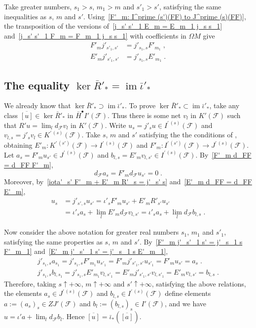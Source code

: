 \documentclass{memo-l}
\theoremstyle{plain}
\theoremstyle{definition}
\theoremstyle{remark}
\newcommand{\FF}{\mathcal{F}}
\newcommand{\im}{\operatorname{im}}
\numberwithin{section}{chapter}
\numberwithin{equation}{section}%
\begin{document}
Take greater numbers, $s_1>s$, $m_1>m$ and $s'_1>s'$, satisfying the same inequalities as $s$, $m$ and $s'$. Using~\eqref{F'_m: I^prime (s')(FF) to J^prime (s)(FF)}, the transposition of the versions of~\eqref{j_s' s'_1 E_m = E_m_1 j_s s_1} and~\eqref{j_s' s'_1 F_m = F_m_1 j_s s_1} with coefficients in $\Omega M$ give
\begin{align}
F'_mj'_{s'_1,s'}&=j'_{s_1,s}F'_{m_1}\;,\label{F'_m j'_s'_1 s' = j'_s_1 s F'_m_1}\\
E'_mj'_{s'_1,s'}&=j'_{s_1,s}E'_{m_1}\;.\label{E'_m j'_s'_1 s' = j'_s_1 s E'_m_1}
\end{align}


\subsection{The equality $\ker\bar R'_*=\im\bar\iota'_*$}\label{ss: ker bar R'_* = im bar iota'_*}

We already know that $\ker\bar R'_*\supset\im\bar\iota'_*$. To prove $\ker\bar R'_*\subset\im\bar\iota'_*$, take any class $\overline{[u]}\in\ker\bar R'_*$ in $\bar H^\bullet I'(\FF)$. Thus there is some net $v_l$ in $K'(\FF)$ such that $R'u=\lim_ld_\FF v_l$ in $K'(\FF)$. Write $u_s=j'_su\in I^{\prime\,(s)}(\FF)$ and $v_{l,s}=j'_sv_l\in K^{\prime\,(s)}(\FF)$. Take $s$, $m$ and $s'$ satisfying the the conditions of , obtaining $E'_m:K^{\prime\,(s')}(\FF)\to I^{\prime\,(s)}(\FF)$ and $F'_m:I^{\prime\,(s')}(\FF)\to J^{\prime\,(s)}(\FF)$. Let $a_s=F'_mu_{s'}\in J^{\prime\,(s)}(\FF)$ and $b_{l,s}=E'_mv_{l,s'}\in I^{\prime\,(s)}(\FF)$. By~\eqref{F'_m d_FF = d_FF F'_m},
\[
d_\FF a_s=F'_md_\FF u_{s'}=0\;.
\]
Moreover, by~\eqref{iota'_s' F'_m + E'_m R'_s = j'_s' s} and~\eqref{E'_m d_FF = d_FF E'_m},
\begin{align*}
u_s&=j'_{s',s}u_{s'}=\iota'_sF'_mu_{s'}+E'_mR'_{s'}u_{s'}\\
&=\iota'_sa_s+\lim_lE'_md_\FF v_{l,s'}
=\iota'_sa_s+\lim_ld_\FF b_{l,s}\;.
\end{align*}

Now consider the above notation for greater real numbers $s_1$, $m_1$ and $s'_1$, satisfying the same properties as $s$, $m$ and $s'$. By~\eqref{F'_m j'_s'_1 s' = j'_s_1 s F'_m_1} and~\eqref{E'_m j'_s'_1 s' = j'_s_1 s E'_m_1},
\begin{gather*}
j'_{s_1,s}a_{s_1}=j'_{s_1,s}F'_{m_1}u_{s'_1}=F'_{m}j'_{s'_1,s'}u_{s'_1}=F'_{m}u_{s'}=a_s\;.\\
j'_{s_1,s}b_{l,s_1}=j'_{s_1,s}E'_{m_1}v_{l,s'_1}=E'_{m}j'_{s'_1,s'}v_{l,s'_1}=E'_{m}v_{l,s'}=b_{l,s}\;.
\end{gather*}
Therefore, taking $s\uparrow+\infty$, $m\uparrow+\infty$ and $s'\uparrow+\infty$, satisfying the above relations, the elements $a_s\in J^{\prime\,(s)}(\FF)$ and $b_{l,s}\in I^{\prime\,(s)}(\FF)$ define elements $a:=(a_s)_s\in ZJ'(\FF)$ and $b_l:=(b_{l,s})_s\in I'(\FF)$, and we have $u=\iota'a+\lim_ld_\FF b_l$. Hence $\overline{[u]}=\bar\iota_*(\overline{[a]})$.
\end{document}
